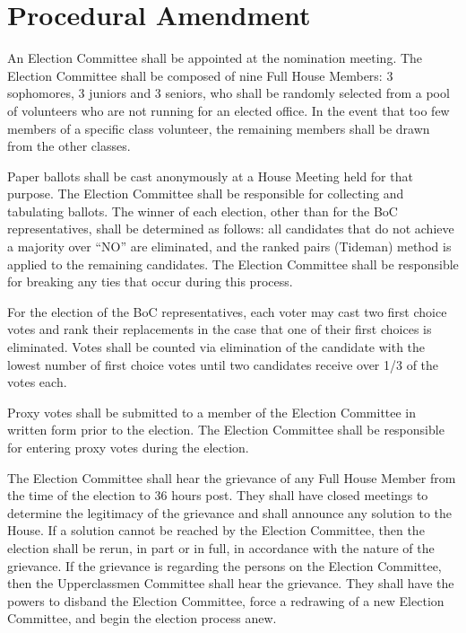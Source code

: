 \documentclass[10pt]{article} %
\begin{document}
\pagebreak
\appendix
\section{Procedural Amendment}
An Election Committee shall be appointed at the nomination meeting. The Election Committee shall be composed of nine Full House Members: 3 sophomores, 3 juniors and 3 seniors, who shall be randomly selected from a pool of volunteers who are not running for an elected office. In the event that too few members of a specific class volunteer, the remaining members shall be drawn from the other classes.

Paper ballots shall be cast anonymously at a House Meeting held for that purpose. The Election Committee shall be responsible for collecting and tabulating ballots. The winner of each election, other than for the BoC representatives, shall be determined as follows: all candidates that do not achieve a majority over ``NO'' are eliminated, and the ranked pairs (Tideman) method is applied to the remaining candidates. The Election Committee shall be responsible for breaking any ties that occur during this process.

For the election of the BoC representatives, each voter may cast two first choice votes and rank their replacements in the case that one of their first choices is eliminated. Votes shall be counted via elimination of the candidate with the lowest number of first choice votes until two candidates receive over 1/3 of the votes each.

Proxy votes shall be submitted to a member of the Election Committee in written form prior to the election. The Election Committee shall be responsible for entering proxy votes during the election.

The Election Committee shall hear the grievance of any Full House Member from the time of the election to 36 hours post. They shall have closed meetings to determine the legitimacy of the grievance and shall announce any solution to the House. If a solution cannot be reached by the Election Committee, then the election shall be rerun, in part or in full, in accordance with the nature of the grievance. If the grievance is regarding the persons on the Election Committee, then the Upperclassmen Committee shall hear the grievance. They shall have the powers to disband the Election Committee, force a redrawing of a new Election Committee, and begin the election process anew.
\end{document}
